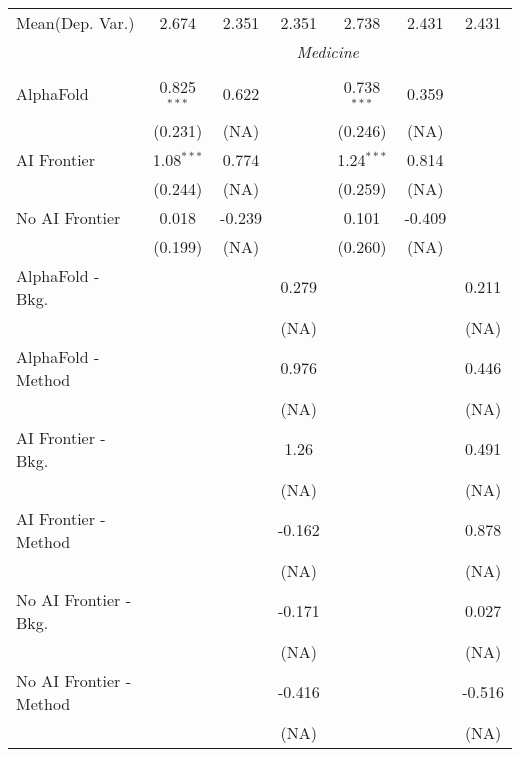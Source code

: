 \begin{tabular}{lcccccc}
Mean(Dep. Var.) & 2.674 & 2.351 & 2.351 & 2.738 & 2.431 & 2.431 \\
 & \multicolumn{6}{c}{\textit{Medicine}} \\ \\
   AlphaFold               & 0.825$^{***}$ & 0.622  &        & 0.738$^{***}$ & 0.359  &   \\   
                           & (0.231)       & (NA)   &        & (0.246)       & (NA)   &   \\   
   AI Frontier             & 1.08$^{***}$  & 0.774  &        & 1.24$^{***}$  & 0.814  &   \\   
                           & (0.244)       & (NA)   &        & (0.259)       & (NA)   &   \\   
   No AI Frontier          & 0.018         & -0.239 &        & 0.101         & -0.409 &   \\   
                           & (0.199)       & (NA)   &        & (0.260)       & (NA)   &   \\   
   AlphaFold - Bkg.        &               &        & 0.279  &               &        & 0.211\\   
                           &               &        & (NA)   &               &        & (NA)\\   
   AlphaFold - Method      &               &        & 0.976  &               &        & 0.446\\   
                           &               &        & (NA)   &               &        & (NA)\\   
   AI Frontier - Bkg.      &               &        & 1.26   &               &        & 0.491\\   
                           &               &        & (NA)   &               &        & (NA)\\   
   AI Frontier - Method    &               &        & -0.162 &               &        & 0.878\\   
                           &               &        & (NA)   &               &        & (NA)\\   
   No AI Frontier - Bkg.   &               &        & -0.171 &               &        & 0.027\\   
                           &               &        & (NA)   &               &        & (NA)\\   
   No AI Frontier - Method &               &        & -0.416 &               &        & -0.516\\   
                           &               &        & (NA)   &               &        & (NA)\\   

\end{tabular}
